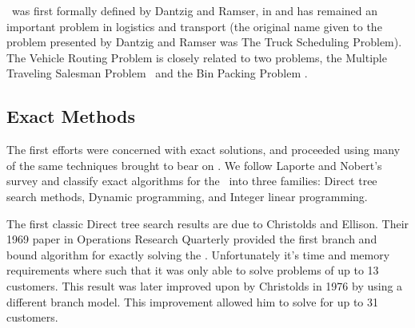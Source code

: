 

% 

\VRP\ was first formally defined by Dantzig and Ramser, in \cite{Dantzig:1959} and has remained an important problem in logistics and transport (the original name given to the problem presented by Dantzig and Ramser was The Truck Scheduling Problem). The Vehicle Routing Problem is closely related to two problems, the Multiple Traveling Salesman Problem \MTSP\ and the Bin Packing Problem \BPP.

\subsection{Exact Methods}

The first efforts were concerned with exact solutions, and proceeded using many of the same techniques brought to bear on \TSP. 
We follow Laporte and Nobert's survey \cite{LANO:87} and classify exact algorithms for the \VRP\ into three families: Direct tree search methods, Dynamic programming, and Integer linear programming.

The first classic Direct tree search results are due to Christolds and Ellison. Their 1969 paper in Operations Research Quarterly provided the first branch and bound algorithm for exactly solving the \VRP \cite{CE:1969}. Unfortunately it's time and memory requirements where such that it was only able to solve problems of up to 13 customers. This result was later improved upon by Christolds in 1976 by using a different branch model. This improvement allowed him to solve for up to 31 customers. 

